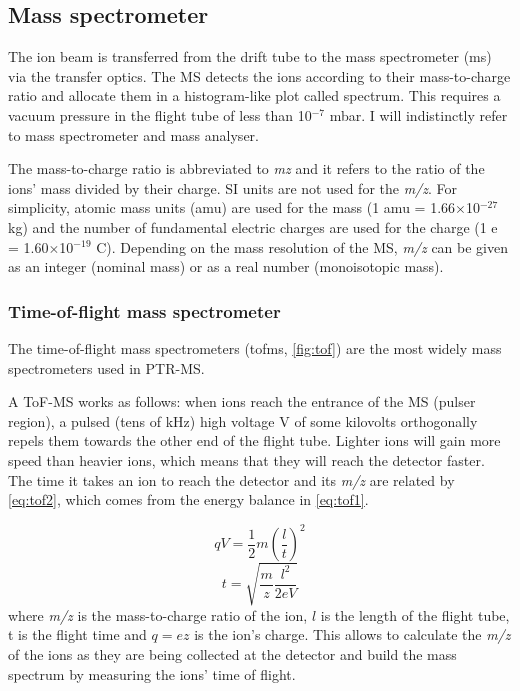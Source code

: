 \subsection{Mass spectrometer}
The ion beam is transferred from the drift tube to the mass spectrometer (\acrshort{ms}) via the transfer optics. The MS detects the ions according to their mass-to-charge ratio and allocate them in a histogram-like plot called spectrum. This  requires a vacuum pressure in the flight tube of less than 10$^{-7}$ mbar. I will indistinctly refer to mass spectrometer and mass analyser.

The mass-to-charge ratio is abbreviated to \textit{\acrshort{mz}} and it refers to the ratio of the ions' mass divided by their charge. SI units are not used for the \textit{m/z}. For simplicity, atomic mass units (\acrshort{amu}) are used for the mass (1 amu = 1.66$\times$10$^{-27}$ kg) and the number of fundamental electric charges are used for the charge (1 e = 1.60$\times$10$^{-19}$ C). Depending on the mass resolution of the MS, \textit{m/z}  can be given as an integer (nominal mass) or as a real number (monoisotopic mass).

\subsubsection{Time-of-flight mass spectrometer}
The time-of-flight mass spectrometers  (\acrshort{tofms}, \autoref{fig:tof})  are  the most widely mass spectrometers used in PTR-MS.

A ToF-MS works as follows: when ions reach the entrance of the MS (pulser region), a pulsed (tens of kHz) high voltage V of some kilovolts orthogonally repels them towards the other end of the flight tube. Lighter ions will gain more speed than heavier ions, which means that they will reach the detector faster. The time it takes an ion to reach the detector and its \textit{m/z} are related by \autoref{eq:tof2}, which comes from the energy balance in \autoref{eq:tof1}.



\begin{equation}
\label{eq:tof1}
qV =  \frac{1}{2} m\left(\frac{l}{t}\right)^2
\end{equation}
\begin{equation}
\label{eq:tof2}
t= \sqrt{\frac{m}{z} \frac{l^2}{2eV}}
\end{equation}
where \textit{m/z} is the mass-to-charge ratio of the ion, $l$ is the length of the flight tube, t is the flight time and $q = e z$ is the ion's charge.
This allows to calculate the \textit{m/z} of the ions as they are being collected at the detector and build the mass spectrum by measuring the ions' time of flight.




